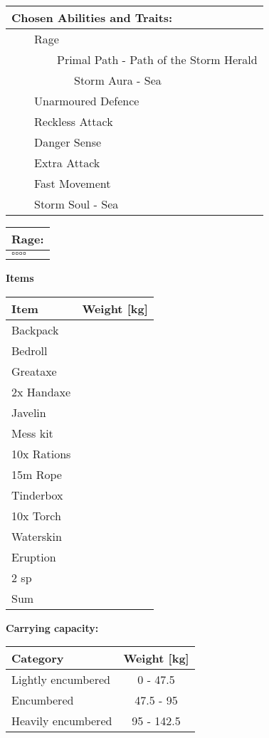 \documentclass[11pt]{article}
\newcommand{\available}{$\square$}
\newcommand{\tabitem}{~~\llap{--}~~}
\newcommand{\tabtabitem}{~~~~~~\llap{$\bullet$}~~}
\newcommand{\tabtabtabitem}{~~~~~~~~~\llap{$\star$}~~}
\begin{document}
\begin{multicols}{2}
\vspace{4mm}

\noindent \begin{tabularx}{95mm}{@{}l}
{\Large \textbf{Chosen Abilities and Traits:}} \\
\hline
\tabitem Rage \\
\tabtabitem Primal Path - Path of the Storm Herald \\
\tabtabtabitem Storm Aura - Sea \\
\tabitem Unarmoured Defence \\
\tabitem Reckless Attack \\
\tabitem Danger Sense \\
\tabitem Extra Attack \\
\tabitem Fast Movement \\
\tabitem Storm Soul - Sea
		\end{tabularx}

\vspace{4mm}

\noindent \begin{tabularx}{95mm}{@{}l}
{\Large \textbf{Rage:}} \\
\hline
\available \available \available \available
		\end{tabularx}
	\end{multicols}

\clearpage

	\begin{center}
{\LARGE \textbf{Items}}
	\end{center}

	\begin{tabularx}{\textwidth}{X|r}
Item & Weight [kg] \\
\hline
Backpack									&			\\
Bedroll										&			\\
Greataxe									&			\\
2x Handaxe									&			\\
Javelin										&			\\
Mess kit									&			\\
10x Rations									&			\\
15m Rope									&			\\
Tinderbox									&			\\
10x Torch									&			\\
Waterskin									&			\\
Eruption									&			\\
2 sp					 					& 			\\
\hline
Sum 										&
	\end{tabularx}

\vspace{10mm}

\textbf{Carrying capacity:} \\

	\begin{tabular}{l|c}
Category & Weight [kg] \\
\hline
Lightly encumbered 	& 0 - 47.5 	\\
Encumbered 			& 47.5 - 95 \\
Heavily encumbered	& 95 - 142.5
	\end{tabular}
\end{document}

